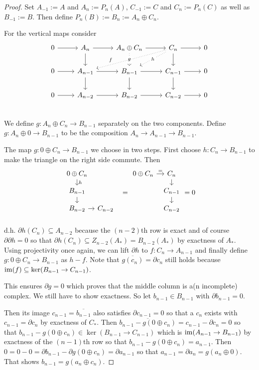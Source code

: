 \documentclass[fontsize=11pt,fleqn,a4paper]{scrartcl}
\begin{document}
\begin{proof}
Set $A_{-1}:=A$ and $A_n:=P_n(A)$, $C_{-1}:=C$ and $C_n:=P_n(C)$ as well as $B_{-1}:=B$. Then define $P_n(B) := B_n:=A_n\oplus C_n$.

For the vertical maps consider
\[\begin{tikzcd}
0 \ar[r] & A_n \ar[r] \ar[d] & A_n\oplus C_n \ar[r] \ar[d,dotted,"g" description] & C_n \ar[r] \ar[d] \ar[dl,dotted,"h" description] \ar[dll,dotted,"f"' near end] & 0 \\
0 \ar[r] & A_{n-1} \ar[r] \ar[d] & B_{n-1} \ar[r]\ar[d] & C_{n-1} \ar[r]\ar[d] & 0 \\
0 \ar[r] & A_{n-2} \ar[r] & B_{n-2} \ar[r] & C_{n-2} \ar[r] & 0 \\
\end{tikzcd}\]
We define $g:A_n\oplus C_n\to B_{n-1}$ separately on the two components. Define $g:A_n\oplus 0\to B_{n-1}$ to be the composition $A_n\to A_{n-1}\to B_{n-1}$.

The map $g: 0\oplus C_n\to B_{n-1}$ we choose in two steps. First choose $h: C_n \to B_{n-1}$ to make the triangle on the right side commute. Then
\[\begin{tikzcd}[column sep=tiny, row sep=small]
0\oplus C_n \ar[d,"h"] & \\
B_{n-1} \ar[d] & \\
B_{n-2} \ar[r] & C_{n-2} & \\
\end{tikzcd} = \begin{tikzcd}[column sep=tiny, row sep=small]
0\oplus C_n \ar[r,"="] & C_n \ar[d] \\
& C_{n-1} \ar[d] \\
& C_{n-2} \\
\end{tikzcd} = 0\]
d.h. $\partial h(C_n) \subseteq A_{n-2}$ because the $(n-2)$th row is exact and of course $\partial\partial h=0$ so that $\partial h(C_n) \subseteq Z_{n-2}(A_\ast) = B_{n-2}(A_\ast)$ by exactness of $A_\ast$. Using projectivity once again, we can lift $\partial h$ to $f: C_n \to A_{n-1}$ and finally define $g:0\oplus C_n\to B_{n-1}$ as $h-f$. Note that $\overline{g(c_n)} = \partial c_n$ still holds because $\operatorname{im}(f) \subseteq\ker(B_{n-1}\to C_{n-1})$.

\medbreak
This ensures $\partial g = 0$ which proves that the middle column is a(n incomplete) complex. We still have to show exactness. So let $b_{n-1}\in B_{n-1}$ with $\partial b_{n-1}=0$.

Then its image $c_{n-1}=\overline{b_{n-1}}$ also satisfies $\partial c_{n-1} =0$ so that a $c_n$ exists with $c_{n-1} = \partial c_n$ by exactness of $C_\ast$. Then $\overline{b_{n-1}-g(0\oplus c_n)} = c_{n-1} - \partial c_n = 0$ so that $b_{n-1}-g(0\oplus c_n)\in\ker(B_{n-1} \to C_{n-1})$ which is $\operatorname{im}(A_{n-1} \to B_{n-1})$ by exactness of the $(n-1)$th row so that $b_{n-1}-g(0\oplus c_n) = a_{n-1}$. Then $0=0-0=\partial b_{n-1} - \partial g(0\oplus c_n) = \partial a_{n-1}$ so that $a_{n-1} = \partial a_n = g(a_n \oplus 0)$. That shows $b_{n-1} = g(a_n\oplus c_n)$.
\end{proof}
\end{document}
